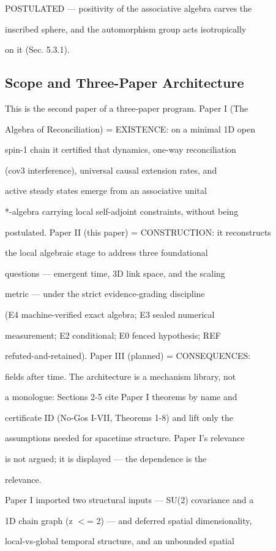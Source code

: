 \documentclass[11pt,a4paper]{article}
\theoremstyle{definition}
\begin{document}
POSTULATED — positivity of the associative algebra carves the

inscribed sphere, and the automorphism group acts isotropically

on it (Sec. 5.3.1).


\subsection{Scope and Three-Paper Architecture}

This is the second paper of a three-paper program. Paper I (The

Algebra of Reconciliation) = EXISTENCE: on a minimal 1D open

spin-1 chain it certified that dynamics, one-way reconciliation

(cov3 interference), universal causal extension rates, and

active steady states emerge from an associative unital

*-algebra carrying local self-adjoint constraints, without being

postulated. Paper II (this paper) = CONSTRUCTION: it reconstructs

the local algebraic stage to address three foundational

questions — emergent time, 3D link space, and the scaling

metric — under the strict evidence-grading discipline

(E4 machine-verified exact algebra; E3 sealed numerical

measurement; E2 conditional; E0 fenced hypothesis; REF

refuted-and-retained). Paper III (planned) = CONSEQUENCES:

fields after time. The architecture is a mechanism library, not

a monologue: Sections 2-5 cite Paper I theorems by name and

certificate ID (No-Gos I-VII, Theorems 1-8) and lift only the

assumptions needed for spacetime structure. Paper I's relevance

is not argued; it is displayed — the dependence is the

relevance.


Paper I imported two structural inputs — SU(2) covariance and a

1D chain graph (z $<$= 2) — and deferred spatial dimensionality,

local-vs-global temporal structure, and an unbounded spatial
\end{document}
